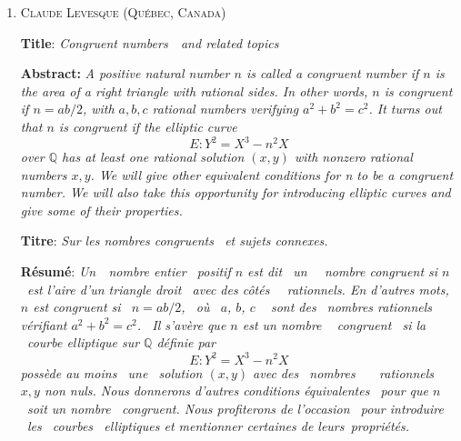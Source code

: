 \documentclass[a4paper,10pt]{article}
\newcommand{\Q}{\mathbb Q}
\begin{document}
\begin{enumerate}
Abstract:  Let $k>1$ be an integer. Moreover, let $\varphi(k)$ denote Euler's totient function and $\omega(k)$ the number of distinct prime divisors of $k$. An integer $k$ is a $P$-integer if the first $\varphi(k)$ primes coprime to $k$ form a reduced residue system modulo $k$. In 1980, Pomerance proved the finiteness of the set of $P$-integers. Moreover, he proposed the following conjecture.
Conjecture: If $k$ is a $P$-integer, then $k\leq 30$.
  In this talk, we will discuss the proof of this conjecture.
Titre : La conjecture de P-entier de Pomerance.
R\'esum\'e: Soit $k>1$ un entier. En outre, soit $\varphi (k)$ la fonction indicatrice d'Euler et $\omega(k)$ le nombre de diviseurs premiers distincts de $k$. Un entier $k$ est un $P$-entier si les premiers $\varphi(k)$ entiers relativement premiers entre eux pour $k$ forment un syst\`eme r\'eduit de r\'esidus modulo $k$. En 1980, Pomerance a  prouv\'e la finitude de l'ensemble des $P$-entiers. En outre, il a propos\'e la conjecture suivante. 
Conjecture: Si $k$ est un $ P$-entier, alors $k \leq 30$. 
  	 Dans cet expos\'e, nous allons discuter du progr\`es jusqu'\`a la preuve de cette conjecture.


\item \textsc{Claude Levesque (Qu\'ebec, Canada)}\medskip

\textbf{Title}: \textit{Congruent numbers  and related topics}

\textbf{Abstract:}  
\textit{A positive natural number $n$ is called a congruent number if $n$ is the area of a right triangle with rational sides. 
In other words, $n$ is congruent if $n = ab/2$, with $a, b, c$ rational numbers verifying $a^2 + b^2 = c^2$. 
It turns out that $n$ is congruent if the elliptic curve
$$E: Y^2 = X^3 - n^2 X$$
over $\Q$ has at least one rational  solution $(x, y)$ with nonzero  rational numbers $x, y$.
We will give other equivalent conditions for n to be a congruent number. We will also  take this opportunity for  
introducing  elliptic curves and give some of their properties.} 
\medskip

\textbf{Titre}: \textit{Sur les nombres congruents  et sujets connexes.}

\textbf{R\'esum\'e}: 
\textit{Un  nombre entier  positif $n$ est dit  un   nombre congruent si $n$  est l'aire d'un 
triangle droit  avec des côt\'es   rationnels. En d'autres mots, $n$ est congruent si  $n = ab/2$,  o\`u  $a$, $b$, $c$  
sont des  nombres rationnels v\'erifiant $a^2 + b^2 = c^2$.  Il s'av\`ere que $n$ est un nombre  
congruent  si la  courbe elliptique sur $\Q$ d\'efinie par 
$$E: Y^2 = X^3 - n^2 X$$
poss\`ede au moins  une  solution $(x,y)$ avec des  nombres    rationnels   $x, y$ non nuls.
Nous donnerons d'autres conditions \'equivalentes  pour que $n$  soit un nombre  congruent. 
Nous profiterons de l'occasion  pour introduire  les  courbes  elliptiques et 
mentionner 
certaines de leurs propri\'et\'es.}\bigskip


\end{enumerate}
\end{document}
